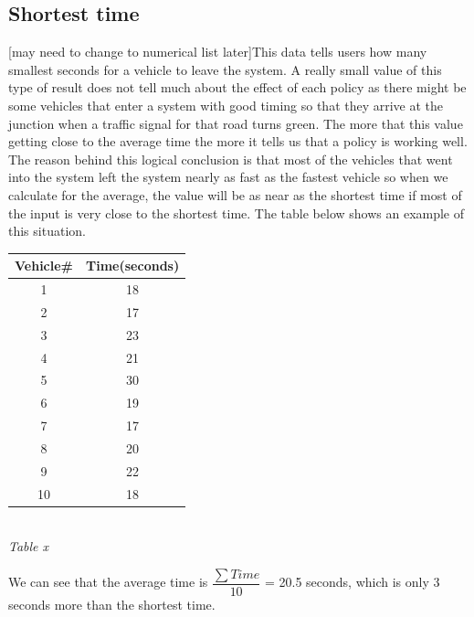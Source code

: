 \documentclass[11pt]{article}
\begin{document}
\subsection{Shortest time}
	[may need to change to numerical list later]This data tells users how many smallest seconds for a vehicle to leave the system. A really small value of this type of result does not tell much about the effect of each policy as there might be some vehicles that enter a system with good timing so that they arrive at the junction when a traffic signal for that road turns green. The more that this value getting close to the average time the more it tells us that a policy is working well. The reason behind this logical conclusion is that most of the vehicles that went into the system left the system nearly as fast as the fastest vehicle so when we calculate for the average, the value will be as near as the shortest time if most of the input is very close to the shortest time. The table below shows an example of this situation.
\\
\begin{center}
	\begin{tabular}{c c}
		\hline
		Vehicle\# & Time(seconds)\\ \hline
		1 & 18 \\
		2 & 17 \\
		3 & 23 \\
		4 & 21 \\
		5 & 30 \\
		6 & 19 \\
		7 & 17 \\
		8 & 20 \\
		9 & 22 \\
		10 & 18 \\ \hline
	\end{tabular}
	\\[0.1 cm]
	\textit{Table x}
\end{center}
We can see that the average	time is $ \dfrac{\sum{Time}}{10} $ = 20.5 seconds, which is only 3 seconds more than the shortest time.
\end{document}
